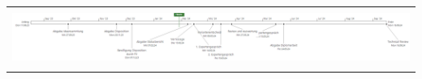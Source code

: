\begin{landscape}
\begin{table}[]
{\begin{tabular}{lllllll}
\multicolumn{7}{l}{}                                                                                                                                                                                                                                                                                                                                                                                                                                                                                                                                                                                                                                                                                                                                                                                                                                            \\
\multicolumn{7}{l}{\includegraphics[width=2\linewidth]{source/status_report/main/init_timeline}}                                                                                                                                                                                                                                                                                                                                                                                                                                                                                                                                                                                                                                                                                                                                                                                                                                            \\
\multicolumn{7}{l}{}                                                                                                                                                                                                                                                                                                                                                                                                                                                                                                                                                                                                                                                                                                                                                                                                                                            \\

\end{tabular}}
\end{table}
\end{landscape}

